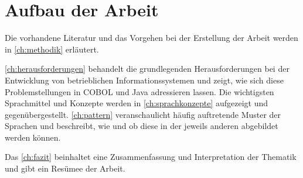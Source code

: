 \section{Aufbau der Arbeit}

Die vorhandene Literatur und das Vorgehen bei der Erstellung der Arbeit werden in \autoref{ch:methodik} erläutert. 

\autoref{ch:herausforderungen} behandelt die grundlegenden Herausforderungen bei der Entwicklung von betrieblichen Informationssystemen und zeigt, wie sich diese Problemstellungen in COBOL und Java adressieren lassen. Die wichtigsten Sprachmittel und Konzepte werden in \autoref{ch:sprachkonzepte} aufgezeigt und gegenübergestellt. \autoref{ch:pattern} veranschaulicht häufig auftretende Muster der Sprachen und beschreibt, wie und ob diese in der jeweils anderen abgebildet werden können. 

Das \autoref{ch:fazit} beinhaltet eine Zusammenfassung und Interpretation der Thematik und gibt ein Re­sü­mee der Arbeit.